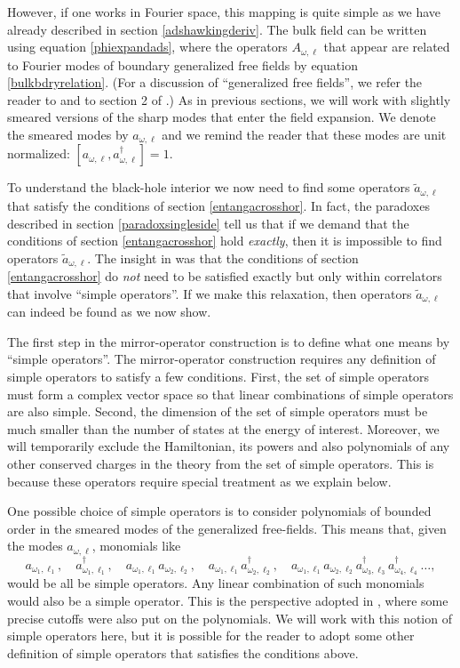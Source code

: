\documentclass[12pt]{article}
\newcommand{\cop}[1]{#1}
\def\ta{\widetilde{\cop{a}}}
\begin{document}
However, if one works in Fourier space, this mapping  is quite simple as we have already described in section \ref{adshawkingderiv}. The bulk field can be written using equation \eqref{phiexpandads}, where the operators $A_{\omega, \ell}$ that appear are related to Fourier modes of boundary generalized free fields by equation \eqref{bulkbdryrelation}. (For a discussion of ``generalized free fields'', we refer the reader to \cite{ElShowk:2011ag} and to section 2 of \cite{Papadodimas:2012aq}.)  As in previous sections,  we will work with slightly smeared versions of the sharp modes that enter the field expansion. We denote the smeared modes by $a_{\omega, \ell}$ and we remind the reader that these modes are unit normalized: $[a_{\omega, \ell}, a_{\omega, \ell}^{\dagger}] = 1$.

To understand the black-hole interior we now need to find some operators $\ta_{\omega, \ell}$ that satisfy the conditions of section \ref{entangacrosshor}. In fact, the paradoxes described in section \ref{paradoxsingleside} tell us that if we demand that the conditions of section \ref{entangacrosshor} hold {\em exactly}, then it is impossible to find operators $\ta_{\omega, \ell}$. The insight in \cite{Papadodimas:2013jku} was that the conditions of section \ref{entangacrosshor} do {\em not} need to be satisfied exactly but only within  correlators that involve ``simple operators''. If we make this relaxation, then operators $\ta_{\omega, \ell}$ can indeed be found as we now show.

The first step in the  mirror-operator construction is to define what one means by  ``simple operators''.   The mirror-operator construction requires any definition of simple operators to satisfy a few conditions.  First, the set of simple operators must form a complex vector space so that linear combinations of simple operators are also simple. Second, the dimension of the set of simple operators must be much smaller than the number of states at the energy of interest.  Moreover, we will temporarily exclude the Hamiltonian, its powers and also polynomials of any other conserved charges in the theory from the set of simple operators. This is because these operators require special treatment as we explain below.

One possible choice of simple operators is to consider polynomials of bounded order in the smeared modes of the generalized free-fields. This means that, given the modes $a_{\omega, \ell}$, monomials like
\[
a_{\omega_1, \ell_1}, \quad a_{\omega_1, \ell_1}^{\dagger}, \quad a_{\omega_1, \ell_1} a_{\omega_2, \ell_2}, \quad a_{\omega_1, \ell_1} a_{\omega_2, \ell_2}^{\dagger}, \quad a_{\omega_1, \ell_1} a_{\omega_2, \ell_2} a_{\omega_3, \ell_3}^{\dagger} a_{\omega_4, \ell_4}^{\dagger} \ldots,
\]
would be all be simple operators. Any linear combination of such monomials would also be a simple operator.  This is the perspective adopted in \cite{Papadodimas:2013jku}, where some precise cutoffs were also put on the polynomials.  We will work with this notion of simple operators here, but it is possible for the reader to adopt some other definition of simple operators that satisfies the conditions above.
\end{document}
